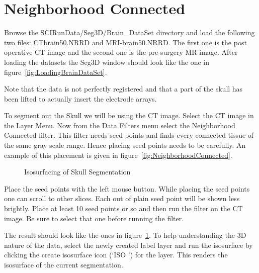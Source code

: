 \documentclass[fleqn,11pt,openany]{book}
\begin{document}
\section{Neighborhood Connected}

Browse the SCIRunData/Seg3D/Brain\_DataSet directory and load the following two files: CTbrain50.NRRD and MRI-brain50.NRRD. The first one is the post operative CT image and the second one is the pre-surgery MR image. After loading the datasets the Seg3D window should look like the one in figure~\ref{fig:LoadingBrainDataSet}. 

Note that the data is not perfectly registered and that a part of the skull has been lifted to actually insert the electrode arrays.

To segment out the Skull we will be using the CT image. Select the CT image in the Layer Menu. Now from the Data
 Filters menu select the Neighborhood Connected filter. This filter needs seed points and finds every connected tissue of the same gray scale range. Hence placing seed points needs to be carefully. An example of this placement is given in figure~\ref{fig:NeighborhoodConnected}. 

\begin{figure}
\caption{Isosurfacing of Skull Segmentation}\label{fig:SkullSegmentation}
\end{figure}

Place the seed points with the left mouse button. While placing the seed points one can scroll to other slices. Each out of plain seed point will be shown less brightly. Place at least 10 seed points or so and then run the filter on the CT image. Be sure to select that one before running the filter.

The result should look like the ones in figure~\ref{fig:SkullSegmentation}. To help understanding the 3D nature of the data, select the newly created label layer and run the isosurface by clicking the create isosurface icon 
(`ISO \Forward') for the layer.  This renders the isosurface of the current segmentation.
\end{document}
